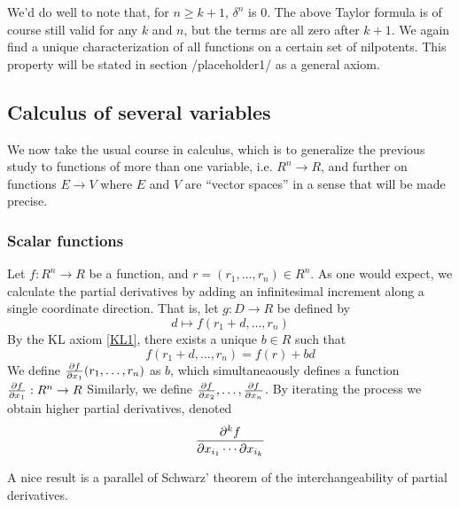 We'd do well to note that, for \( n\geq k+1 \), \( \delta^n \) is 0. The above Taylor formula is of course still valid for any \( k \) and \( n \), but the terms are all zero after \( k+1 \). We again find a unique characterization of all functions on a certain set of nilpotents. This property will be stated in section {/placeholder1/} as a general axiom.

\subsection{Calculus of several variables}
We now take the usual course in calculus, which is to generalize the previous study to functions of more than one variable, i.e. \( R^n\to R \), and further on functions \( E\to V \) where \( E \) and \( V \) are ``vector spaces'' in a sense that will be made precise.

\subsubsection{Scalar functions}
Let \( f:R^n\to R \) be a function, and \( r=(r_1,\dots,r_n)\in R^n \). As one would expect, we calculate the partial derivatives by adding an infinitesimal increment along a single coordinate direction. That is, let \( g: D\to R \) be defined by
\begin{equation*}
  d\mapsto f(r_1+d,\dots,r_n)
\end{equation*}
By the KL axiom \ref{KL1}, there exists a unique \( b\in R \) such that
\begin{equation*}
  f(r_1+d,\dots,r_n) = f(r) + bd
\end{equation*}
We define \( \frac{\partial f}{\partial x_1}(r_1,\dots,r_n)\) as \( b \), which simultaneaously defines a function \( \frac{\partial f}{\partial x_1}:R^n\to R \) Similarly, we define \( \frac{\partial f}{\partial x_2},\dots,\frac{\partial f}{\partial x_n} \). By iterating the process we obtain higher partial derivatives, denoted
\begin{equation*}
  \frac{\partial^{k} f}{\partial x_{i_1} \cdots \partial x_{i_k}}
\end{equation*}

A nice result is a parallel of Schwarz' theorem of the interchangeability of partial derivatives.

